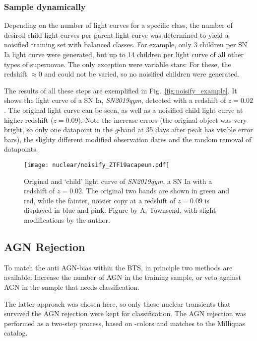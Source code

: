 \subsubsection{Sample dynamically}
Depending on the number of light curves for a specific class, the number of desired child light curves per parent light curve was determined to yield a noisified training set with balanced classes. For example, only 3 children per SN Ia light curve were generated, but up to 14 children per light curve of all other types of supernovae. The only exception were variable stars: For these, the redshift $\approx 0$ and could not be varied, so no noisified children were generated.

The results of all these steps are exemplified in Fig.~\ref{fig:noisify_example}. It shows the light curve of a SN Ia, \textit{SN2019qym}, detected with a redshift of $z=0.02$. The original light curve can be seen, as well as a noisified child light curve at higher redshift ($z=0.09$). Note the increase errors (the original object was very bright, so only one datapoint in the \textit{g}-band at 35 days after peak has visible error bars), the slighty different modified observation dates and the random removal of datapoints.

\begin{figure}[H]
  \texttt{[image: nuclear/noisify\_ZTF19acapeun.pdf]}
  \caption[Augmentation example]{Original and `child' light curve of \textit{SN2019qym}, a SN Ia with a redshift of $z=0.02$. The original two bands are shown in green and red, while the fainter, noisier copy at a redshift of $z=0.09$ is displayed in blue and pink. Figure by A. Townsend, with slight modifications by the author.}
\end{figure}

\subsection{AGN Rejection}\label{agn_rejection}
To match the anti AGN-bias within the BTS, in principle two methods are available: Increase the number of AGN in the training sample, or veto against AGN in the sample that needs classification.

The latter approach was chosen here, so only those nuclear transients that survived the AGN rejection were kept for classification. The AGN rejection was performed as a two-step process, based on -colors and matches to the Milliquas catalog.

